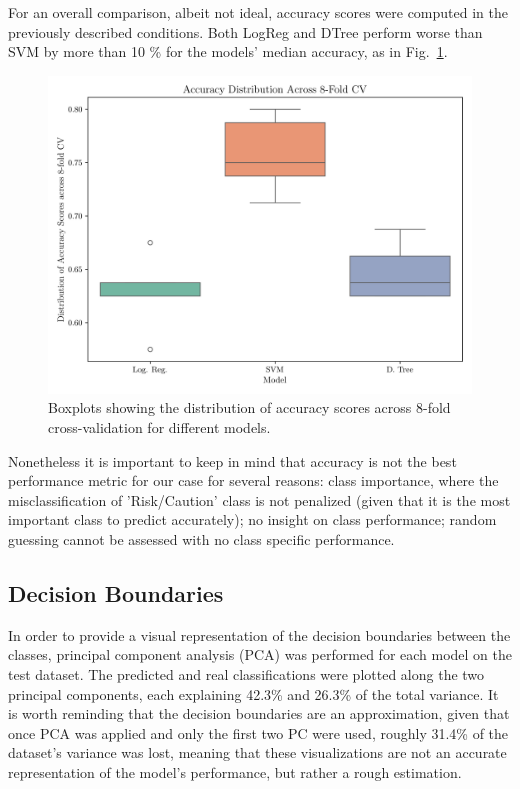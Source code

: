 \documentclass[conference]{IEEEtran}
\begin{document}
For an overall comparison, albeit not ideal,  accuracy scores were computed in the previously described conditions. Both LogReg and DTree perform worse than SVM by more than 10 \% for the models' median accuracy, as in Fig.~\ref{box_accuracy}. 

\begin{figure}[H]
    \centering
    \includegraphics[width=1\linewidth]{assets/box_accuracy.png}
    \caption{Boxplots showing the distribution of accuracy scores across 8-fold cross-validation for different models.}
    \label{box_accuracy}
\end{figure} %

Nonetheless it is important to keep in mind that accuracy is not the best performance metric for our case for several reasons: class importance, where the misclassification of 'Risk/Caution' class is not penalized (given that it is the most important class to predict accurately); no insight on class performance; random guessing cannot be assessed with no class specific performance.

\subsection{Decision Boundaries}

In order to provide a visual representation of the decision boundaries between the classes, principal component analysis (PCA) was performed for each model on the test dataset. The predicted and real classifications were plotted along the two principal components, each explaining 42.3\% and 26.3\% of the total variance. It is worth reminding that the decision boundaries are an approximation, given that once PCA was applied and only the first two PC were used, roughly 31.4\% of the dataset's variance was lost, meaning that these visualizations are not an accurate representation of the model's performance, but rather a rough estimation.
\end{document}
